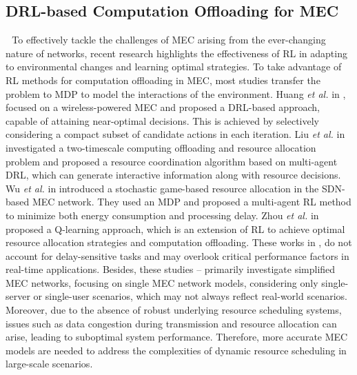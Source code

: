 \documentclass[12pt,draftclsnofoot,onecolumn]{IEEEtran}
\newenvironment{my}[2]%
{\begin{list}{}%
{\setlength{\rightmargin}{#1}\setlength{\leftmargin}{#2}}%


 \item[]{}

} {\end{list}}
\begin{document}
\begin{enumerate}
\begin{my}{1cm}{1cm}
{	\subsection{DRL-based Computation Offloading for MEC}
	\,\,\,\,To effectively tackle the challenges of MEC arising from the ever-changing nature of networks, recent research highlights the effectiveness of RL in adapting to environmental changes and learning optimal strategies. To take advantage of RL methods for computation offloading in MEC, most studies transfer the problem to MDP to model the interactions of the environment.
	Huang \textit{et al.} in \cite{huang2019deep}, focused on a wireless-powered MEC and proposed a DRL-based approach, capable of attaining near-optimal decisions. This is achieved by selectively considering a compact subset of candidate actions in each iteration. Liu \textit{et al.} in \cite{liu2021learn} investigated a two-timescale computing offloading and resource allocation problem and proposed a resource coordination algorithm based on multi-agent DRL, which can generate interactive information along with resource decisions. 
	Wu \textit{et al.} in \cite{wu2023computation} introduced a stochastic game-based resource allocation in the SDN-based MEC network. They used an MDP and proposed a multi-agent RL method to minimize both energy consumption and processing delay. Zhou \textit{et al.} in \cite{zhou2021deep} proposed a Q-learning approach, which is an extension of RL to achieve optimal resource allocation strategies and computation offloading. 
	These works in \cite{huang2019deep}, \cite{liu2021learn} do not account for delay-sensitive tasks and may overlook critical performance factors in real-time applications. Besides, these studies \cite{huang2019deep}--\cite{zhou2021deep} primarily investigate simplified MEC networks, focusing on single MEC network models, considering only single-server or single-user scenarios, which may not always reflect real-world scenarios. 
	Moreover, due to the absence of robust underlying resource scheduling systems, issues such as data congestion during transmission and resource allocation can arise, leading to suboptimal system performance. Therefore, more accurate MEC models are needed to address the complexities of dynamic resource scheduling in large-scale scenarios. \vspace{2mm}
	
}
\end{my}
\end{enumerate}
\end{document}
